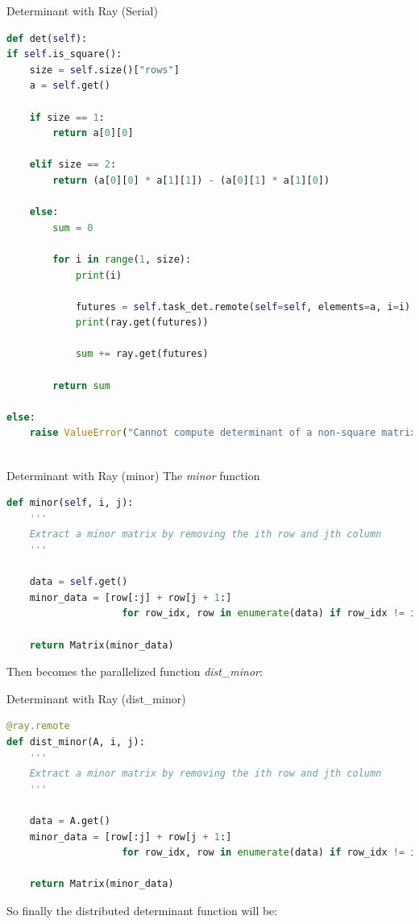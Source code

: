 \documentclass{beamer}
\begin{document}
\begin{frame}[fragile]{Determinant with Ray (Serial)}
    \begin{lstlisting}[language=Python]
def det(self):
if self.is_square():
    size = self.size()["rows"]
    a = self.get()

    if size == 1:
        return a[0][0]

    elif size == 2:
        return (a[0][0] * a[1][1]) - (a[0][1] * a[1][0])

    else:
        sum = 0

        for i in range(1, size):
            print(i)

            futures = self.task_det.remote(self=self, elements=a, i=i)
            print(ray.get(futures))

            sum += ray.get(futures)

        return sum

else:
    raise ValueError("Cannot compute determinant of a non-square matrix")
        
            \end{lstlisting}
\end{frame}

\begin{frame}[fragile]{Determinant with Ray (minor)}
    The \textit{minor} function
    \begin{lstlisting}[language=Python]
    def minor(self, i, j):
    '''
    Extract a minor matrix by removing the ith row and jth column
    '''

    data = self.get()
    minor_data = [row[:j] + row[j + 1:]
                    for row_idx, row in enumerate(data) if row_idx != i]

    return Matrix(minor_data)
\end{lstlisting}
    Then becomes the parallelized function \textit{dist\_minor}:
\end{frame}

\begin{frame}[fragile]{Determinant with Ray (dist\_minor)}
    \begin{lstlisting}[language=Python]
@ray.remote
def dist_minor(A, i, j):
    '''
    Extract a minor matrix by removing the ith row and jth column
    '''

    data = A.get()
    minor_data = [row[:j] + row[j + 1:]
                    for row_idx, row in enumerate(data) if row_idx != i]

    return Matrix(minor_data)
        \end{lstlisting}
    So finally the distributed determinant function will be:
\end{frame}
\end{document}
